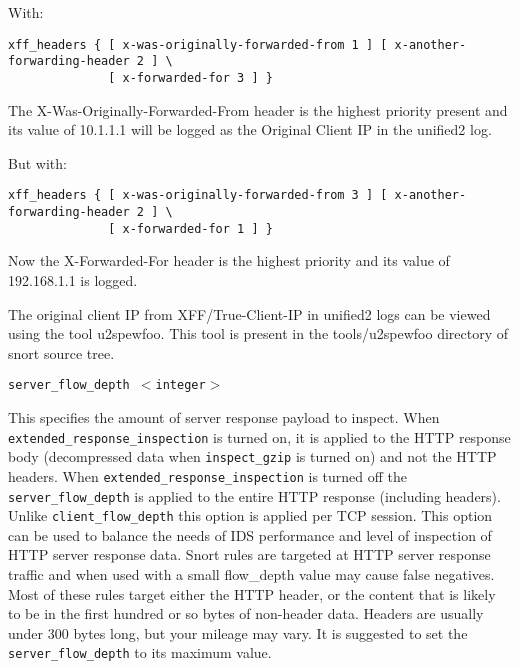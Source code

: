\documentclass[english]{report}
\newcounter{slistnum}
\newenvironment{slist}
{ \begin{list}{ {\bf \arabic{slistnum}.} }{\usecounter{slistnum} } }
{ \end{list} }
\newenvironment{note}{
\samepage
    \vspace{10pt}{\textsf{
        {\hspace{7pt}\Huge{$\triangle$\hspace{-12.5pt}{\Large{$^!$}}}}\hspace{5pt}
        {\Large{NOTE}}
    }
    }
   \begin{center}
    \par\vspace{-17pt}

    \begin{lrbox}{\savepar}
    \begin{minipage}[r]{6in}
}
{
    \end{minipage}
    \end{lrbox}
    \fbox{
        \usebox{
            \savepar
	}
    }
    \par\vskip10pt
    \end{center}
}
\newenvironment{note}{
        \begin{rawhtml}
        <p><table border="1"><tr><td><b>
        Note:&nbsp;&nbsp;</b>
        \end{rawhtml}
}{
        \begin{rawhtml}
        </b></td></tr></table></p>
        \end{rawhtml}
}
\begin{document}
\begin{slist}
With:
\begin{verbatim}
xff_headers { [ x-was-originally-forwarded-from 1 ] [ x-another-forwarding-header 2 ] \
              [ x-forwarded-for 3 ] }
\end{verbatim}

The X-Was-Originally-Forwarded-From header is the highest priority present and its value
of 10.1.1.1 will be logged as the Original Client IP in the unified2 log.

But with:
\begin{verbatim}
xff_headers { [ x-was-originally-forwarded-from 3 ] [ x-another-forwarding-header 2 ] \
              [ x-forwarded-for 1 ] }
\end{verbatim}

Now the X-Forwarded-For header is the highest priority and its value of 192.168.1.1 is logged.


\begin{note}

The original client IP from XFF/True-Client-IP in unified2 logs can be viewed using 
the tool u2spewfoo. This tool is present in the tools/u2spewfoo directory of snort 
source tree.

\end{note}

\item \texttt{server\_flow\_depth $<$integer$>$}

This specifies the amount of server response payload to inspect. When
\texttt{extended\_response\_inspection} is turned on, it is applied to the HTTP response 
body (decompressed data when \texttt{inspect\_gzip} is turned on) and not the HTTP headers.
When \texttt{extended\_response\_inspection} is turned off the \texttt{server\_flow\_depth} 
is applied to the entire HTTP response (including headers). Unlike \texttt{client\_flow\_depth} 
this option is applied per TCP session. This option can be used to balance the needs of 
IDS performance and level of inspection of HTTP server response data.  Snort rules are       
targeted at HTTP server response traffic and when used with a small flow\_depth value 
may cause false negatives. Most of these rules target either the HTTP header, or 
the content that is likely to be in the first hundred or so bytes of non-header data.  
Headers are usually under 300 bytes long, but your mileage may vary. 
It is suggested to set the \texttt{server\_flow\_depth} to its maximum value.


\end{slist}
\end{document}
